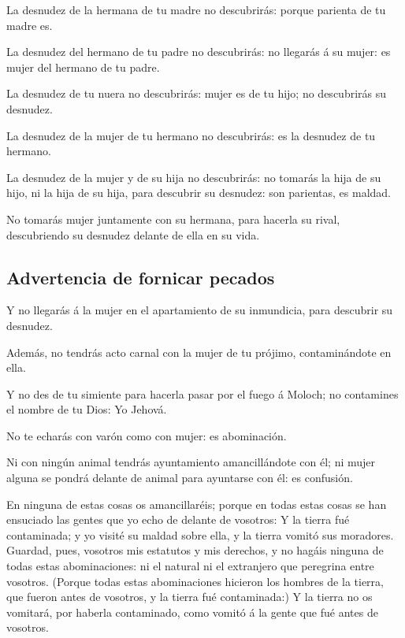  La desnudez de la hermana de tu madre no descubrirás:
porque parienta de tu madre es.

 La desnudez del hermano de tu padre no descubrirás: no
llegarás á su mujer: es mujer del hermano de tu padre.

 La desnudez de tu nuera no descubrirás: mujer es de tu
hijo; no descubrirás su desnudez.

 La desnudez de la mujer de tu hermano no descubrirás: es
la desnudez de tu hermano.

 La desnudez de la mujer y de su hija no descubrirás: no
tomarás la hija de su hijo, ni la hija de su hija, para descubrir su
desnudez: son parientas, es maldad.

 No tomarás mujer juntamente con su hermana, para hacerla
su rival, descubriendo su desnudez delante de ella en su vida.

\hypertarget{advertencia-de-fornicar-pecados}{%
\subsection{Advertencia de fornicar
pecados}\label{advertencia-de-fornicar-pecados}}

 Y no llegarás á la mujer en el apartamiento de su
inmundicia, para descubrir su desnudez.

 Además, no tendrás acto carnal con la mujer de tu
prójimo, contaminándote en ella.

 Y no des de tu simiente para hacerla pasar por el fuego
á Moloch; no contamines el nombre de tu Dios: Yo Jehová.

 No te echarás con varón como con mujer: es abominación.

 Ni con ningún animal tendrás ayuntamiento amancillándote
con él; ni mujer alguna se pondrá delante de animal para ayuntarse con
él: es confusión.

 En ninguna de estas cosas os amancillaréis; porque en
todas estas cosas se han ensuciado las gentes que yo echo de delante de
vosotros:  Y la tierra fué contaminada; y yo visité su
maldad sobre ella, y la tierra vomitó sus moradores. 
Guardad, pues, vosotros mis estatutos y mis derechos, y no hagáis
ninguna de todas estas abominaciones: ni el natural ni el extranjero que
peregrina entre vosotros.  (Porque todas estas
abominaciones hicieron los hombres de la tierra, que fueron antes de
vosotros, y la tierra fué contaminada:)  Y la tierra no
os vomitará, por haberla contaminado, como vomitó á la gente que fué
antes de vosotros.

